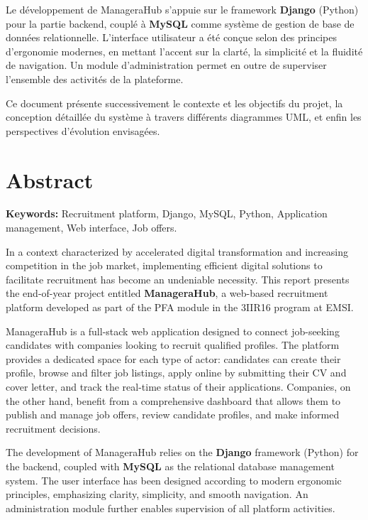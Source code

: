 \documentclass[12pt,a4paper]{report}
\begin{document}
Le développement de ManageraHub s'appuie sur le framework \textbf{Django} (Python) pour la partie backend, couplé à \textbf{MySQL} comme système de gestion de base de données relationnelle. L'interface utilisateur a été conçue selon des principes d'ergonomie modernes, en mettant l'accent sur la clarté, la simplicité et la fluidité de navigation. Un module d'administration permet en outre de superviser l'ensemble des activités de la plateforme.

Ce document présente successivement le contexte et les objectifs du projet, la conception détaillée du système à travers différents diagrammes UML, et enfin les perspectives d'évolution envisagées.

\chapter*{Abstract}
\thispagestyle{plain}

\begin{infobox}
\textbf{Keywords:} Recruitment platform, Django, MySQL, Python, Application management, Web interface, Job offers.
\end{infobox}

\vspace{0.5cm}

In a context characterized by accelerated digital transformation and increasing competition in the job market, implementing efficient digital solutions to facilitate recruitment has become an undeniable necessity. This report presents the end-of-year project entitled \textbf{ManageraHub}, a web-based recruitment platform developed as part of the PFA module in the 3IIR16 program at EMSI.

ManageraHub is a full-stack web application designed to connect job-seeking candidates with companies looking to recruit qualified profiles. The platform provides a dedicated space for each type of actor: candidates can create their profile, browse and filter job listings, apply online by submitting their CV and cover letter, and track the real-time status of their applications. Companies, on the other hand, benefit from a comprehensive dashboard that allows them to publish and manage job offers, review candidate profiles, and make informed recruitment decisions.

The development of ManageraHub relies on the \textbf{Django} framework (Python) for the backend, coupled with \textbf{MySQL} as the relational database management system. The user interface has been designed according to modern ergonomic principles, emphasizing clarity, simplicity, and smooth navigation. An administration module further enables supervision of all platform activities.
\end{document}
